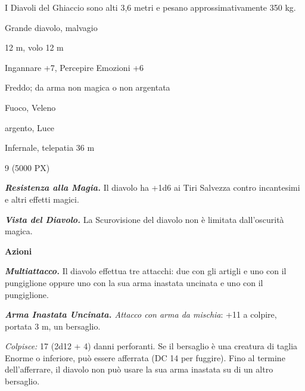 \begin{multicols}{2}
{I Diavoli del Ghiaccio sono alti 3,6 metri e pesano approssimativamente 350 kg.

\begin{description}[noitemsep, topsep=0pt, parsep=0pt, partopsep=0pt, itemsep=1pt, leftmargin=2.35cm,  labelwidth=2.2cm, itemindent=0cm, listparindent=0pt] %
\setlength{\baselineskip}{10pt}
\item[\textbf{Taglia/Tipo}] Grande diavolo, malvagio
\item[\textbf{Caratt.}] 
\item[\textbf{Punti Ferita}] 
\item[\textbf{Movimento}] 12 m, volo 12 m
\item[\textbf{Tiri Salvez.}] 
\item[\textbf{Comp.}] Ingannare +7, Percepire Emozioni +6
\item[\textbf{Res. Danni}] Freddo; da arma non magica o non argentata
\item[\textbf{Imm. Danni}] Fuoco, Veleno
\item[\textbf{Vulnerabilità}] argento, Luce
\item[\textbf{Sensi}] 
\item[\textbf{Linguaggi}] Infernale, telepatia 36 m
\item[\textbf{Sfida}] 9 (5000 PX)
\end{description}
\smallskip

\emph{\textbf{Resistenza alla Magia.}} Il diavolo ha +1d6 ai Tiri Salvezza contro incantesimi e altri effetti magici.

\emph{\textbf{Vista del Diavolo.}} La Scurovisione del diavolo non è limitata dall'oscurità magica.

\textbf{Azioni}

\emph{\textbf{Multiattacco.}} Il diavolo effettua tre attacchi: due con gli artigli e uno con il pungiglione oppure uno con la sua arma inastata uncinata e uno con il pungiglione.

\emph{\textbf{Arma Inastata Uncinata.} Attacco con arma da mischia}: +11 a colpire, portata 3 m, un bersaglio.

\emph{Colpisce:} 17 (2d12 + 4) danni perforanti. Se il bersaglio è una creatura di taglia Enorme o inferiore, può essere afferrata (DC 14 per fuggire). Fino al termine dell'afferrare, il diavolo non può usare la sua arma inastata su di un altro bersaglio.

}
\end{multicols}
